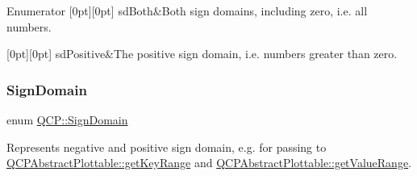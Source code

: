 \begin{DoxyEnumFields}{Enumerator}
[0pt][0pt]{}\mbox{\label{namespace_q_c_p_afd50e7cf431af385614987d8553ff8a9a3dee7e9cd2fedce9253b83e172626a6c}} 
sd\+Both&Both sign domains, including zero, i.\+e. all numbers. \\
\hline

[0pt][0pt]{}\mbox{\label{namespace_q_c_p_afd50e7cf431af385614987d8553ff8a9a23362334a52289677a51526a9b68db6c}} 
sd\+Positive&The positive sign domain, i.\+e. numbers greater than zero. \\
\hline

\end{DoxyEnumFields}
\mbox{\label{namespace_q_c_p_afd50e7cf431af385614987d8553ff8a9}} 
\subsubsection{\texorpdfstring{Sign\+Domain}{SignDomain}\hspace{0.1cm}{\footnotesize\ttfamily [2/2]}}
{\footnotesize\ttfamily enum \hyperlink{namespace_q_c_p_afd50e7cf431af385614987d8553ff8a9}{Q\+C\+P\+::\+Sign\+Domain}}

Represents negative and positive sign domain, e.\+g. for passing to \hyperlink{class_q_c_p_abstract_plottable_a4da16d3cd4b509e1104a9b0275623c96}{Q\+C\+P\+Abstract\+Plottable\+::get\+Key\+Range} and \hyperlink{class_q_c_p_abstract_plottable_a4de773988b21ed090fddd27c6a3a3dcb}{Q\+C\+P\+Abstract\+Plottable\+::get\+Value\+Range}.

